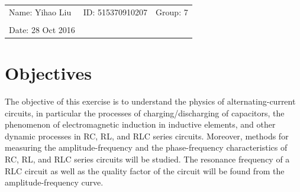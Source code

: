 \documentclass{article}
\begin{document}
\vspace*{0.25cm}

\hrulefill

\thispagestyle{empty}

\begin{center}
\begin{large}
\end{large}

\hrulefill

\vspace*{5cm}
\begin{Large}
\end{Large}

\vspace{2em}

\begin{large}
\end{large}
\end{center}


\vfill

\begin{table}[h!]
\flushleft
\begin{tabular}{lll}
Name: Yihao Liu \hspace*{2em}&
ID: 515370910207\hspace*{2em}& Group: 7\\


\\

Date: 28 Oct 2016 

\end{tabular}
\end{table}

\hfill
\begin{tiny}
[rev. 1.0]
\end{tiny}

\newpage

\tableofcontents

\newpage

\section{Objectives}

The objective of this exercise is to understand the physics of alternating-current circuits, in particular the processes of charging/discharging of capacitors, the phenomenon of electromagnetic induction in inductive elements, and other dynamic processes in RC, RL, and RLC series circuits. Moreover, methods for measuring the amplitude-frequency and the phase-frequency characteristics of RC, RL, and RLC series circuits will be studied. The resonance frequency of a RLC circuit as well as the quality factor of the circuit will be found from the amplitude-frequency curve.
\end{document}
